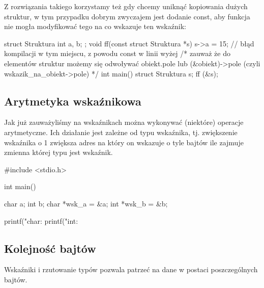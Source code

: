 Z rozwiązania takiego korzystamy też gdy chcemy uniknąć kopiowania dużych struktur, w tym przypadku dobrym zwyczajem jest dodanie const, aby funkcja nie mogła modyfikować tego na co wskazuje ten wskaźnik:

\begin{CodeFrame*}[c]{}
struct Struktura {
  int a, b;
};
void ff(const struct Struktura *s) {
    s->a = 15; // błąd kompilacji w tym miejscu, z powodu const w linii wyżej
    /* zauważ że do elementów struktur możemy się odwoływać
       obiekt.pole lub (&obiekt)->pole (czyli wskazik_na_obiekt->pole) */
}
int main() {
    struct Struktura s;
    ff (&s);
}
\end{CodeFrame*}


\subsection{Arytmetyka wskaźnikowa}

Jak już zauważyliśmy na wskaźnikach można wykonywać (niektóre) operacje arytmetyczne. Ich działanie jest zależne od typu wskaźnika, tj. zwiększenie wskaźnika o 1 zwiększa adres na który on wskazuje o tyle bajtów ile zajmuje zmienna której typu jest wskaźnik.

\begin{CodeFrame*}[c]{}
#include <stdio.h>

int main() {
    char a;    int    b;
    char *wsk_a = &a;
    int    *wsk_b = &b;
    
    printf("char: %
    printf("int:    %
}
\end{CodeFrame*}


\subsection{Kolejność bajtów }

Wskaźniki i rzutowanie typów pozwala patrzeć na dane w postaci poszczególnych bajtów.


